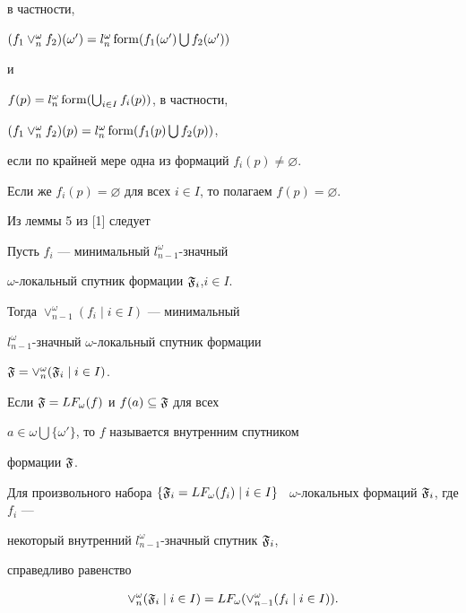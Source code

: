 в частности,


$(f_1\vee_n^{\omega}f_2)(\omega')=l_n^{\omega}\form


(f_1(\omega')\bigcup f_2(\omega'))$


и


$f(p)=l_n^{\omega}\operatorname{form} (\bigcup_{i\in I}f_i(p))$, в частности,


$(f_1\vee_n^{\omega}f_2)(p)=l_n^{\omega}\operatorname{form} (f_1(p)\bigcup f_2(p))$,


если по крайней мере одна из формаций $f_i(p)\ne\varnothing$.


Если же $f_i(p)=\varnothing$ для всех $i\in I$, то полагаем $f(p)=\varnothing$.





Из леммы 5 из [1] следует





\begin{lem}


Пусть $f_i$ --- минимальный $l_{n-1}^{\omega}$-значный


$\omega$-локальный спутник формации $\frak{F}_i$,\linebreak $i\in I$.


Тогда $\vee_{n-1}^{\omega}(f_i\mid i\in I)$ --- минимальный


$l_{n-1}^{\omega}$-значный $\omega$-локальный спутник формации\linebreak


$\frak{F}=\vee_n^{\omega}(\frak{F}_i\mid i\in I)$.


\end{lem}





Если $\frak{F}=LF_{\omega}(f)$ и $f(a)\subseteq\frak{F}$ для всех


$a\in\omega\bigcup\{\omega'\}$, то $f$ называется внутренним спутником


формации $\frak{F}$.





\begin{lem}


Для произвольного набора $\{\frak{F}_i=LF_{\omega}(f_i)


\mid i\in I\}$ \ $\omega$-локальных формаций $\frak{F}_i$, где $f_i$ ---


некоторый внутренний $l_{n-1}^{\omega}$-значный спутник $\frak{F}_i$,


справедливо равенство


$$


\vee_{n}^{\omega}(\frak{F}_i\mid i\in I)=


LF_{\omega}(\vee_{n-1}^{\omega}(f_i\mid i\in I)).


$$


\end{lem}





